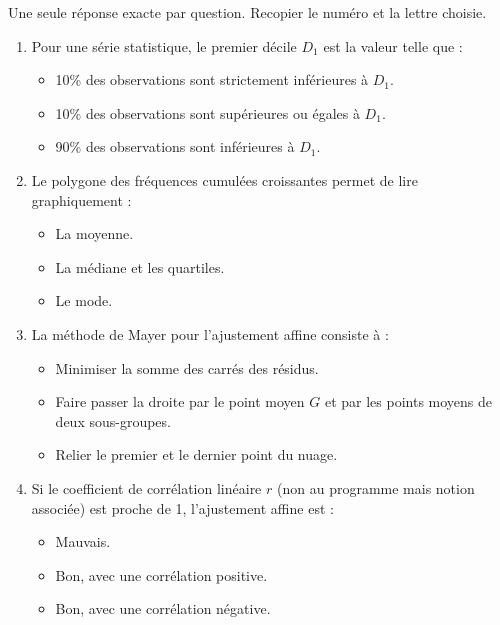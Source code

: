 \documentclass[11pt]{article}
\begin{document}
\begin{exercice}
Une seule réponse exacte par question. Recopier le numéro et la lettre choisie.
\begin{enumerate}
    \item Pour une série statistique, le premier décile $D_1$ est la valeur telle que :
    \begin{itemize}
        \item[A.] 10\% des observations sont strictement inférieures à $D_1$.
        \item[B.] 10\% des observations sont supérieures ou égales à $D_1$.
        \item[C.] 90\% des observations sont inférieures à $D_1$.
    \end{itemize}
    \item Le polygone des fréquences cumulées croissantes permet de lire graphiquement :
    \begin{itemize}
        \item[A.] La moyenne.
        \item[B.] La médiane et les quartiles.
        \item[C.] Le mode.
    \end{itemize}
    \item La méthode de Mayer pour l'ajustement affine consiste à :
    \begin{itemize}
        \item[A.] Minimiser la somme des carrés des résidus.
        \item[B.] Faire passer la droite par le point moyen $G$ et par les points moyens de deux sous-groupes.
        \item[C.] Relier le premier et le dernier point du nuage.
    \end{itemize}
    \item Si le coefficient de corrélation linéaire $r$ (non au programme mais notion associée) est proche de 1, l'ajustement affine est :
    \begin{itemize}
        \item[A.] Mauvais.
        \item[B.] Bon, avec une corrélation positive.
        \item[C.] Bon, avec une corrélation négative.
    \end{itemize}
\end{enumerate}
\end{exercice}
\end{document}
